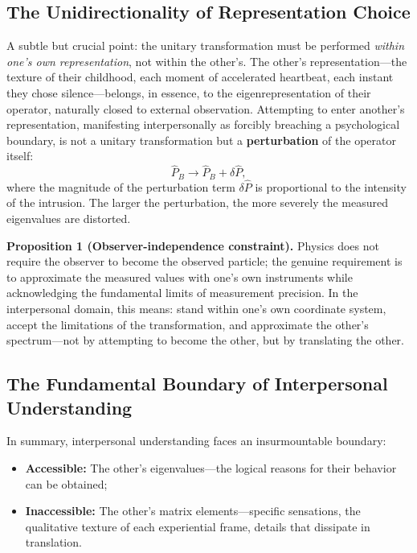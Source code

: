 ﻿\documentclass[11pt,a4paper]{article}
\begin{document}
\subsection{The Unidirectionality of Representation Choice}

A subtle but crucial point: the unitary transformation must be performed \emph{within one's own representation}, not within the other's. The other's representation---the texture of their childhood, each moment of accelerated heartbeat, each instant they chose silence---belongs, in essence, to the eigenrepresentation of their operator, naturally closed to external observation. Attempting to enter another's representation, manifesting interpersonally as forcibly breaching a psychological boundary, is not a unitary transformation but a \textbf{perturbation} of the operator itself:
\begin{equation}
\hat{P}_B \to \hat{P}_B + \delta\hat{P},
\label{eq:perturbation}
\end{equation}
where the magnitude of the perturbation term $\delta\hat{P}$ is proportional to the intensity of the intrusion. The larger the perturbation, the more severely the measured eigenvalues are distorted.

\textbf{Proposition 1 (Observer-independence constraint).} Physics does not require the observer to become the observed particle; the genuine requirement is to approximate the measured values with one's own instruments while acknowledging the fundamental limits of measurement precision. In the interpersonal domain, this means: stand within one's own coordinate system, accept the limitations of the transformation, and approximate the other's spectrum---not by attempting to become the other, but by translating the other.

\subsection{The Fundamental Boundary of Interpersonal Understanding}

In summary, interpersonal understanding faces an insurmountable boundary:

\begin{itemize}
    \item \textbf{Accessible:} The other's eigenvalues---the logical reasons for their behavior can be obtained;
    \item \textbf{Inaccessible:} The other's matrix elements---specific sensations, the qualitative texture of each experiential frame, details that dissipate in translation.
\end{itemize}
\end{document}
